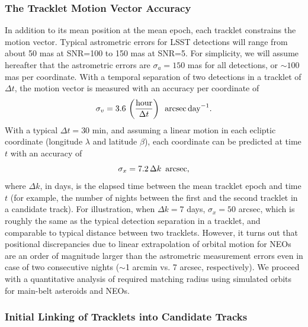 \subsubsection{The Tracklet Motion Vector Accuracy \label{sec:astromerrors}}

In addition to its mean position at the mean epoch, each tracklet constrains the motion vector.
Typical astrometric errors for LSST detections will range from about 50 mas at SNR=100 to
150 mas at SNR=5. For simplicity, we will assume hereafter that the astrometric errors are
$\sigma_a=150$ mas for all detections, or $\sim 100$ mas per coordinate. With a temporal
separation of two detections in a tracklet of $\Delta t$, the motion vector is measured with an
accuracy per coordinate of
\begin{equation}
\label{eq:sigv}
          \sigma_v = 3.6 \, \left({\rm hour} \over \Delta t\right) \,\,\, {\rm arcsec} \, {\rm day}^{-1}.
\end{equation}
With a typical $\Delta t = 30$ min, and assuming a linear motion in each ecliptic coordinate (longitude
$\lambda$ and latitude $\beta$), each coordinate can be predicted at time $t$ with an accuracy of
\begin{equation}
            \sigma_x = 7.2 \, \Delta k \,\,\, {\rm arcsec},
\end{equation}
where $\Delta k$, in days, is the elapsed time between the mean tracklet epoch and time $t$
(for example, the number of nights between the first and the second tracklet in a candidate track).
For illustration, when $\Delta k = 7$ days, $\sigma_x = 50$ arcsec, which is roughly the same
as the typical detection separation in a tracklet, and comparable to typical distance between
two tracklets.  However, it turns out that positional discrepancies due to linear extrapolation of
orbital motion for NEOs are an order of magnitude larger than the astrometric measurement errors
even in case of two consecutive nights ($\sim$1 arcmin vs. 7 arcsec, respectively). We proceed with
a quantitative analysis of required matching radius using simulated orbits for main-belt asteroids
and NEOs.



\subsubsection{Initial Linking of Tracklets into Candidate Tracks}

